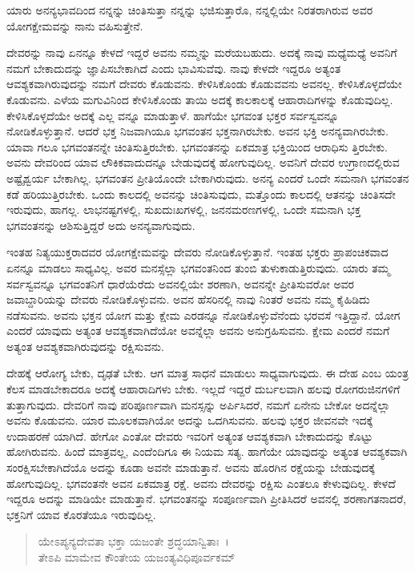 {\small ಯಾರು ಅನನ್ಯಭಾವದಿಂದ ನನ್ನನ್ನು ಚಿಂತಿಸುತ್ತಾ ನನ್ನನ್ನು ಭಜಿಸುತ್ತಾರೊ, ನನ್ನಲ್ಲಿಯೇ ನಿರತರಾಗಿರುವ ಅವರ ಯೋಗಕ್ಷೇಮವನ್ನು ನಾನು ವಹಿಸುತ್ತೇನೆ.}

ದೇವರನ್ನು ನಾವು ಏನನ್ನೂ ಕೇಳದೆ ಇದ್ದರೆ ಅವನು ನಮ್ಮನ್ನು ಮರೆಯಬಹುದು. ಅದಕ್ಕೆ ನಾವು ಮಧ್ಯೆಮಧ್ಯೆ ಅವನಿಗೆ ನಮಗೆ ಬೇಕಾದುದನ್ನು ಜ್ಞಾಪಿಸಬೇಕಾಗಿದೆ ಎಂದು ಭಾವಿಸುವೆವು. ನಾವು ಕೇಳದೇ ಇದ್ದರೂ ಅತ್ಯಂತ ಆವಶ್ಯಕವಾಗಿರುವುದನ್ನು ನಮಗೆ ದೇವರು ಕೊಡುವನು. ಕೇಳಿಸಿಕೊಂಡು ಕೊಡುವವನು ಅವನಲ್ಲ. ಕೇಳಿಸಿಕೊಳ್ಳದೆಯೇ ಕೊಡುವನು. ಎಳೆಯ ಮಗುವಿನಿಂದ ಕೇಳಿಸಿಕೊಂಡು ತಾಯಿ ಅದಕ್ಕೆ ಕಾಲಕಾಲಕ್ಕೆ ಆಹಾರಾದಿಗಳನ್ನು ಕೊಡುವುದಿಲ್ಲ. ಕೇಳಿಸಿಕೊಳ್ಳದೆಯೇ ಅದಕ್ಕೆ ಎಲ್ಲ ವನ್ನೂ ಮಾಡುತ್ತಾಳೆ. ಹಾಗೆಯೇ ಭಗವಂತ ಭಕ್ತರ ಸರ್ವಸ್ವವನ್ನೂ ನೋಡಿಕೊಳ್ಳುತ್ತಾನೆ. ಆದರೆ ಭಕ್ತ ನಿಜವಾಗಿಯೂ ಭಗವಂತನ ಭಕ್ತನಾಗಿರಬೇಕು. ಅವನ ಭಕ್ತಿ ಅನನ್ಯವಾಗಿರಬೇಕು. ಯಾವಾ ಗಲೂ ಭಗವಂತನನ್ನೇ ಚಿಂತಿಸುತ್ತಿರಬೇಕು. ಭಗವಂತನನ್ನು ಏಕಮಾತ್ರ ಭಕ್ತಿಯಿಂದ ಆರಾಧಿಸು ತ್ತಿರಬೇಕು. ಅವನು ದೇವರಿಂದ ಯಾವ ಲೌಕಿಕವಾದುದನ್ನೂ ಬೇಡುವುದಕ್ಕೆ ಹೋಗುವುದಿಲ್ಲ. ಅವನಿಗೆ ದೇವರ ಉಗ್ರಾಣದಲ್ಲಿರುವ ಅಷ್ಟೈಶ್ವರ್ಯ ಬೇಕಾಗಿಲ್ಲ. ಭಗವಂತನ ಪ್ರೀತಿಯೊಂದೇ ಬೇಕಾಗಿರುವುದು. ಅನನ್ಯ ಎಂದರೆ ಒಂದೇ ಸಮನಾಗಿ ಭಗವಂತನ ಕಡೆ ಹರಿಯುತ್ತಿರಬೇಕು. ಒಂದು ಕಾಲದಲ್ಲಿ ಅವನನ್ನು ಚಿಂತಿಸುವುದು, ಮತ್ತೊಂದು ಕಾಲದಲ್ಲಿ ಆತನನ್ನು ಚಿಂತಿಸದೇ ಇರುವುದು, ಹಾಗಲ್ಲ. ಲಾಭನಷ್ಟಗಳಲ್ಲಿ, ಸುಖದುಃಖಗಳಲ್ಲಿ, ಜನನಮರಣಗಳಲ್ಲಿ, ಒಂದೇ ಸಮನಾಗಿ ಭಕ್ತ ಭಗವಂತನನ್ನು ಆಶಿಸುತ್ತಿದ್ದರೆ ಅದು ಅನನ್ಯವಾಗುವುದು.

ಇಂತಹ ನಿತ್ಯಯುಕ್ತರಾದವರ ಯೋಗಕ್ಷೇಮವನ್ನು ದೇವರು ನೋಡಿಕೊಳ್ಳುತ್ತಾನೆ. ಇಂತಹ ಭಕ್ತರು ಪ್ರಾಪಂಚಿಕವಾದ ಏನನ್ನೂ ಮಾಡಲು ಸಾಧ್ಯವಿಲ್ಲ. ಅವರ ಮನಸ್ಸೆಲ್ಲಾ ಭಗವಂತನಿಂದ ತುಂಬಿ ತುಳುಕಾಡುತ್ತಿರುವುದು. ಯಾರು ತಮ್ಮ ಸರ್ವಸ್ವವನ್ನೂ ಭಗವಂತನಿಗೆ ಧಾರೆಯೆರೆದು ಅವನಲ್ಲಿಯೇ ಶರಣಾಗಿ, ಅವನನ್ನೇ ಪ್ರೀತಿಸುವರೋ ಅವರ ಜವಾಬ್ದಾರಿಯನ್ನು ದೇವರು ನೋಡಿಕೊಳ್ಳುವನು. ಅವನ ಹೆಸರಿನಲ್ಲಿ ನಾವು ನಿಂತರೆ ಅವನು ನಮ್ಮ ಕೈಹಿಡಿದು ನಡೆಸುವನು. ಅವನು ಭಕ್ತನ ಯೋಗ ಮತ್ತು ಕ್ಷೇಮ ಎರಡನ್ನೂ ನೋಡಿಕೊಳ್ಳುವೆನೆಂದು ಭರವಸೆ ಇತ್ತಿದ್ದಾನೆ. ಯೋಗ ಎಂದರೆ ಯಾವುದು ಅತ್ಯಂತ ಆವಶ್ಯಕವಾಗಿದೆಯೋ ಅವನ್ನೆಲ್ಲಾ ಅವನು ಅನುಗ್ರಹಿಸುವನು. ಕ್ಷೇಮ ಎಂದರೆ ನಮಗೆ ಅತ್ಯಂತ ಆವಶ್ಯಕವಾಗಿರುವುದನ್ನು ರಕ್ಷಿಸುವನು.

ದೇಹಕ್ಕೆ ಆರೋಗ್ಯ ಬೇಕು, ದೃಢತೆ ಬೇಕು. ಆಗ ಮಾತ್ರ ಸಾಧನೆ ಮಾಡುಲು ಸಾಧ್ಯವಾಗುವುದು. ಈ ದೇಹ ಎಂಬ ಯಂತ್ರ ಕೆಲಸ ಮಾಡಬೇಕಾದರೂ ಅದಕ್ಕೆ ಆಹಾರಾದಿಗಳು ಬೇಕು. ಇಲ್ಲದೆ ಇದ್ದರೆ ದುರ್ಬಲವಾಗಿ ಹಲವು ರೋಗರುಜಿನಗಳಿಗೆ ತುತ್ತಾಗುವುದು. ದೇವರಿಗೆ ನಾವು ಪರಿಪೂರ್ಣವಾಗಿ ಮನಸ್ಸನ್ನು ಅರ್ಪಿಸಿದರೆ, ನಮಗೆ ಏನೇನು ಬೇಕೋ ಅದನ್ನೆಲ್ಲಾ ಅವನು ಕೊಡುವನು. ಯಾರ ಮೂಲಕವಾಗಿಯೋ ಅದನ್ನು ಒದಗಿಸುವನು. ಹಲವು ಭಕ್ತರ ಜೀವನವೇ ಇದಕ್ಕೆ ಉದಾಹರಣೆ ಯಾಗಿದೆ. ಹೇಗೋ ಎಂತೋ ದೇವರು ಇವರಿಗೆ ಅತ್ಯಂತ ಆವಶ್ಯಕವಾಗಿ ಬೇಕಾದುದನ್ನು ಕೊಟ್ಟು ಹೋಗಿರುವನು. ಹಿಂದೆ ಮಾತ್ರವಲ್ಲ, ಎಂದೆಂದಿಗೂ ಈ ನಿಯಮ ಸತ್ಯ. ಹಾಗೆಯೇ ಯಾವುದನ್ನು ಅತ್ಯಂತ ಆವಶ್ಯಕವಾಗಿ ಸಂರಕ್ಷಿಸಬೇಕಾಗಿದೆಯೊ ಅದನ್ನು ಕೂಡಾ ಅವನೇ ಮಾಡುತ್ತಾನೆ. ಅವನು ಹೊರಗಿನ ರಕ್ಷೆಯನ್ನು ಬೇಡುವುದಕ್ಕೆ ಹೋಗುವುದಿಲ್ಲ. ಭಗವಂತನೇ ಅವನ ಏಕಮಾತ್ರ ರಕ್ಷೆ. ಅವನು ದೇವರನ್ನು ರಕ್ಷಿಸು ಎಂತಲೂ ಕೇಳುವುದಿಲ್ಲ. ಕೇಳದೆ ಇದ್ದರೂ ಅದನ್ನು ಮಾಡಿಯೇ ಮಾಡುತ್ತಾನೆ. ಭಗವಂತನನ್ನು ಸಂಪೂರ್ಣವಾಗಿ ಪ್ರೀತಿಸಿದರೆ ಅವನಲ್ಲಿ ಶರಣಾಗತನಾದರೆ, ಭಕ್ತನಿಗೆ ಯಾವ ಕೊರತೆಯೂ ಇರುವುದಿಲ್ಲ.

\begin{verse}
ಯೇಽಪ್ಯನ್ಯದೇವತಾ ಭಕ್ತಾ ಯಜಂತೇ ಶ್ರದ್ಧಯಾನ್ವಿತಾಃ~।\\ತೇಽಪಿ ಮಾಮೇವ ಕೌಂತೇಯ ಯಜಂತ್ಯವಿಧಿಪೂರ್ವಕಮ್ 
\end{verse}


